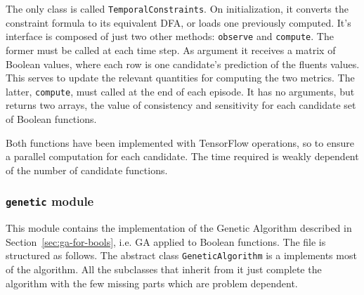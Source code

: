 The only class is called \texttt{TemporalConstraints}. On initialization, it
converts the constraint formula to its equivalent DFA, or loads one previously
computed. It's interface is composed of just two other methods:
\texttt{observe} and \texttt{compute}. The former must be called at each time
step. As argument it receives a matrix of Boolean values, where each row is
one candidate's prediction of the fluents values. This serves to update the
relevant quantities for computing the two metrics. The latter,
\texttt{compute}, must called at the end of each episode. It has no arguments,
but returns two arrays, the value of consistency and sensitivity for each
candidate set of Boolean functions.

Both functions have been implemented with TensorFlow operations, so to
ensure a parallel computation for each candidate. The time required is weakly
dependent of the number of candidate functions.


\subsubsection*{\texttt{genetic} module}

This module contains the implementation of the Genetic Algorithm described in
Section~\ref{sec:ga-for-bools}, i.e. GA applied to Boolean functions. The file
is structured as follows. The abstract class \texttt{GeneticAlgorithm} is a
implements most of the algorithm. All the subclasses that inherit from it
just complete the algorithm with the few missing parts which are problem
dependent.

